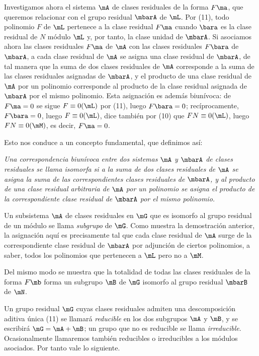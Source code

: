 \documentclass[11pt]{article}
\begin{document}
Investigamos ahora el sistema $\mA$ de clases residuales de la forma $F\ma$, que queremos relacionar con el grupo residual $\mbarA$ de $\mL$. Por (11), todo polinomio $F$ de $\mL$ pertenece a la clase residual $F\ma$ cuando $\bara$ es la clase residual de $N$ módulo $\mL$ y, por tanto, la clase unidad de $\mbarA$. Si asociamos ahora las clases residuales $F\ma$ de $\mA$ con las clases residuales $F\bara$ de $\mbarA$, a cada clase residual de $\mA$ se asigna una clase residual de $\mbarA$, de tal manera que la suma de dos clases residuales de $\mA$ corresponde a la suma de las clases residuales asignadas de $\mbarA$, y el producto de una clase residual de $\mA$ por un polinomio corresponde al producto de la clase residual asignada de $\mbarA$ por el mismo polinomio. Esta asignación es además biunívoca: de $F\ma=0$ se sigue $F\equiv0(\mL)$ por (11), luego $F\bara=0$; recíprocamente, $F\bara=0$, luego $F\equiv0(\mL)$, dice también por (10) que $FN\equiv0(\mL)$, luego $FN\equiv0(\mM)$, es decir, $F\ma=0$.

Esto nos conduce a un concepto fundamental, que definimos así:

\emph{Una correspondencia biunívoca entre dos sistemas $\mA$ y $\mbarA$ de clases residuales se llama isomorfa si a la suma de dos clases residuales de $\mA$ se asigna la suma de las correspondientes clases residuales de $\mbarA$, y al producto de una clase residual arbitraria de $\mA$ por un polinomio se asigna el producto de la correspondiente clase residual de $\mbarA$ por el mismo polinomio.}

Un subsistema $\mA$ de clases residuales en $\mG$ que es isomorfo al grupo residual de un módulo se llama \emph{subgrupo} de $\mG$. Como muestra la demostración anterior, la asignación aquí es precisamente tal que cada clase residual de $\mA$ surge de la correspondiente clase residual de $\mbarA$ por adjunción de ciertos polinomios, a saber, todos los polinomios que pertenecen a $\mL$ pero no a $\mM$.

Del mismo modo se muestra que la totalidad de todas las clases residuales de la forma $F\mb$ forma un subgrupo $\mB$ de $\mG$ isomorfo al grupo residual $\mbarB$ de $\mN$.

Un grupo residual $\mG$ cuyas clases residuales admiten una descomposición aditiva única (11) se llamará \emph{reducible} en los dos subgrupos $\mA$ y $\mB$, y se escribirá $\mG=\mA+\mB$; un grupo que no es reducible se llama \emph{irreducible}. Ocasionalmente llamaremos también reducibles o irreducibles a los módulos asociados. Por tanto vale lo siguiente.
\end{document}
